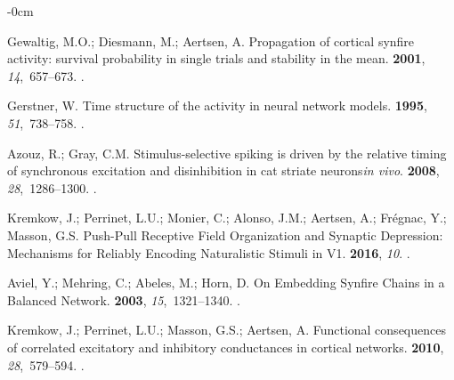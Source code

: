 \documentclass[brainsci, %
               review,submit,pdftex,moreauthors
               ]{Definitions/mdpi}
\begin{document}
\begin{adjustwidth}{-\extralength}{0cm}
\begin{thebibliography}{999}
  Gewaltig, M.O.; Diesmann, M.; Aertsen, A.
  \newblock Propagation of cortical synfire activity: survival probability in
    single trials and stability in the mean.
   {\bf 2001}, {\em 14},~657--673.
  .
  
  Gerstner, W.
  \newblock Time structure of the activity in neural network models.
   {\bf 1995}, {\em 51},~738--758.
  .
  
  Azouz, R.; Gray, C.M.
  \newblock Stimulus-selective spiking is driven by the relative timing of
    synchronous excitation and disinhibition in cat striate neurons\textit{in
    vivo}.
   {\bf 2008}, {\em
    28},~1286--1300.
  .
  
  Kremkow, J.; Perrinet, L.U.; Monier, C.; Alonso, J.M.; Aertsen, A.; Frégnac,
    Y.; Masson, G.S.
  \newblock Push-{Pull} {Receptive} {Field} {Organization} and {Synaptic}
    {Depression}: {Mechanisms} for {Reliably} {Encoding} {Naturalistic} {Stimuli}
    in {V1}.
   {\bf 2016}, {\em 10}.
  .
  
  Aviel, Y.; Mehring, C.; Abeles, M.; Horn, D.
  \newblock On {Embedding} {Synfire} {Chains} in a {Balanced} {Network}.
   {\bf 2003}, {\em 15},~1321--1340.
  .
  
  Kremkow, J.; Perrinet, L.U.; Masson, G.S.; Aertsen, A.
  \newblock Functional consequences of correlated excitatory and inhibitory
    conductances in cortical networks.
   {\bf 2010}, {\em
    28},~579--594.
  .
  

\end{thebibliography}
\end{adjustwidth}
\end{document}
